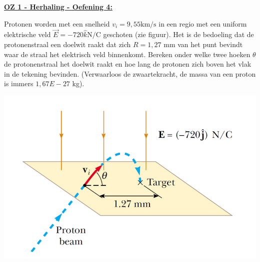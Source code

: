 \textbf{\underline{OZ 1 - Herhaling - Oefening 4:}}
\vspace{0.5cm}


\begin{minipage}{.73\textwidth}
    Protonen worden met een snelheid $v_i = 9, 55 \text{km/s}$ in een regio
    met een uniform elektrische veld $\Vec{E} = -720\hat{k} \text{N/C}$ geschoten (zie figuur). Het is de bedoeling dat de protonenstraal een doelwit raakt dat zich $R = 1, 27 $ mm van het punt bevindt waar de
    straal het elektrisch veld binnenkomt. Bereken onder welke twee hoeken $\theta$ de protonenstraal het
    doelwit raakt en hoe lang de protonen zich boven het vlak in de tekening bevinden. (Verwaarloos
    de zwaartekracht, de massa van een proton is immers $1, 67E-27 $ kg).
\end{minipage}
\begin{minipage}{.23\textwidth}
    \includegraphics[scale = 0.31]{oz01/herhaling/resources/ElektronenElektrischVeld.png}
\end{minipage}


